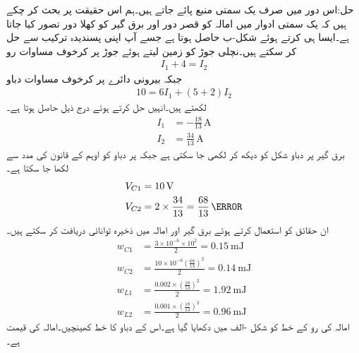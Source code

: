 حل:اس دور میں صرف یک سمتی منبع پائے جاتے ہیں۔ہم اس حقیقت پر بحث کر چکے ہیں کہ یک سمتی ادوار میں امالہ کو قصر دور اور برق گیر کو کھلا دور تصور کیا جاتا ہے۔ایسا ہی کرتے ہوئے  شکل-ب حاصل ہوتا ہے جسے آپ اپنی پسندیدہ  ترکیب سے حل کر سکتے ہیں۔نچلی جوڑ کو زمین لیتے ہوئے جوڑ  پر کرخوف مساوات رو
\begin{align*}
I_1+4=I_2
\end{align*} 
جبکہ بیرونی دائرے پر کرخوف مساوات دباو
\begin{align*}
10=6I_1+(5+2)I_2
\end{align*}
 لکھتے ہیں۔انہیں حل کرتے ہوئے درج ذیل حاصل ہوتا ہے۔
\begin{align*}
I_1&=-\frac{18}{13}\, \si{\ampere}\\
I_2&=\frac{34}{13}\,\si{\ampere}
\end{align*}
برق گیر  پر دباو شکل کو دیکھ کر لکھی جا سکتی ہے  جبکہ   پر دباو کو اوہم کے قانون کی مدد سے لکھا جا سکتا ہے۔
\begin{align*}
V_{C1}&=\SI{10}{\volt}\\
V_{C2}&=2 \times \frac{34}{13}=\frac{68}{13}\,\volt
\end{align*}
ان حقائق کو استعمال کرتے ہوئے برق گیر اور امالہ میں ذخیرہ توانائی دریافت کر سکتے ہیں۔
\begin{align*}
w_{C1}&=\frac{3\times 10^{-6} \times 10^2}{2}=\SI{0.15}{\milli\joule}\\
w_{C2}&=\frac{10 \times 10^{-6} \left(\frac{68}{13}\right)^2}{2}=\SI{0.14}{\milli\joule}\\
w_{L1}&=\frac{0.002\times \left(\frac{18}{13}\right)^2 }{2}=\SI{1.92}{\milli\joule}\\
w_{L2}&=\frac{0.001\times \left(\frac{18}{13}\right)^2}{2}=\SI{0.96}{\milli\joule}
\end{align*}
امالہ کی رو کے خط کو شکل -الف میں دکھایا گیا ہے۔اس کے دباو کا خط کھینچیں۔امالہ کی قیمت  ہے۔

